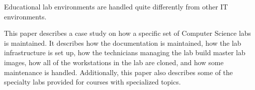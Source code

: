 \thispagestyle{empty}

Educational lab environments are handled quite differently from other IT environments.  

This paper describes a case study on how a specific set of Computer Science labs is maintained.  It describes how the documentation is maintained, how the lab infrastructure is set up, how the technicians managing the lab build master lab images, how all of the workstations in the lab are cloned, and how some maintenance is handled.  Additionally, this paper also describes some of the specialty labs provided for courses with specialized topics. 
